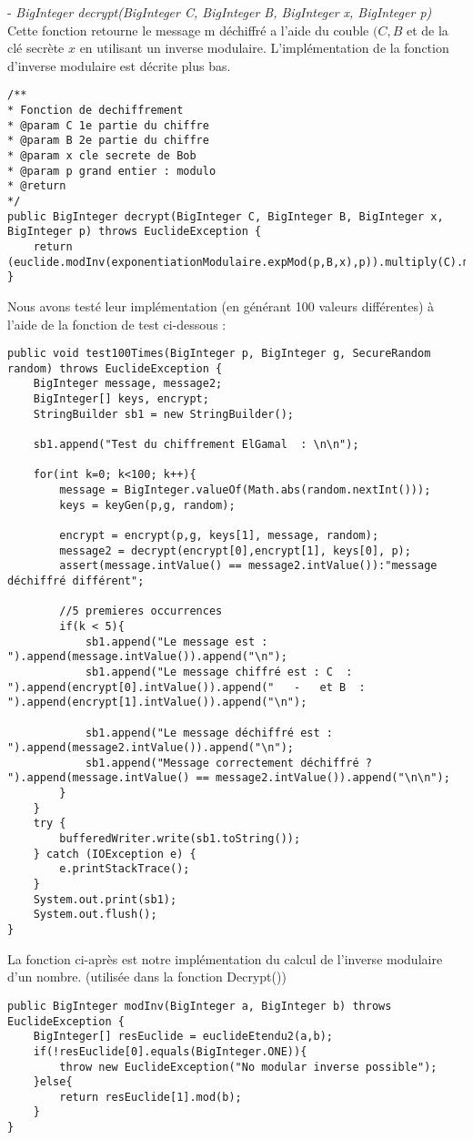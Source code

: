 \documentclass[a4paper,11pt]{article}
\begin{document}
    - \textit{BigInteger decrypt(BigInteger C, BigInteger B, BigInteger x, BigInteger p)} Cette fonction retourne le message m déchiffré a l'aide du couble $(C,B$ et de la clé secrète $x$ en utilisant un inverse modulaire. L'implémentation de la fonction d'inverse modulaire est décrite plus bas.
    \begin{lstlisting}[caption=decrypt, captionpos=b,breaklines = true]
/**
* Fonction de dechiffrement
* @param C 1e partie du chiffre
* @param B 2e partie du chiffre
* @param x cle secrete de Bob
* @param p grand entier : modulo
* @return
*/
public BigInteger decrypt(BigInteger C, BigInteger B, BigInteger x, BigInteger p) throws EuclideException {
    return (euclide.modInv(exponentiationModulaire.expMod(p,B,x),p)).multiply(C).mod(p);
}
    \end{lstlisting}Nous avons testé leur implémentation (en générant 100 valeurs différentes) à l'aide de la fonction de test ci-dessous : \\\begin{lstlisting}[caption=Test chiffrement El-Gamal, captionpos=b,breaklines = true]
public void test100Times(BigInteger p, BigInteger g, SecureRandom random) throws EuclideException {
    BigInteger message, message2;
    BigInteger[] keys, encrypt;
    StringBuilder sb1 = new StringBuilder();

    sb1.append("Test du chiffrement ElGamal  : \n\n");

    for(int k=0; k<100; k++){
        message = BigInteger.valueOf(Math.abs(random.nextInt()));
        keys = keyGen(p,g, random);

        encrypt = encrypt(p,g, keys[1], message, random);
        message2 = decrypt(encrypt[0],encrypt[1], keys[0], p);
        assert(message.intValue() == message2.intValue()):"message déchiffré différent";

        //5 premieres occurrences
        if(k < 5){
            sb1.append("Le message est : ").append(message.intValue()).append("\n");
            sb1.append("Le message chiffré est : C  : ").append(encrypt[0].intValue()).append("   -   et B  : ").append(encrypt[1].intValue()).append("\n");

            sb1.append("Le message déchiffré est : ").append(message2.intValue()).append("\n");
            sb1.append("Message correctement déchiffré ?  ").append(message.intValue() == message2.intValue()).append("\n\n");
        }
    }
    try {
        bufferedWriter.write(sb1.toString());
    } catch (IOException e) {
        e.printStackTrace();
    }
    System.out.print(sb1);
    System.out.flush();
}
    \end{lstlisting}La fonction ci-après est notre implémentation du calcul de l'inverse modulaire d'un nombre. (utilisée dans la fonction Decrypt()) \\\begin{lstlisting}[caption=Inverse modulaire, captionpos=b,breaklines = true]
public BigInteger modInv(BigInteger a, BigInteger b) throws EuclideException {
    BigInteger[] resEuclide = euclideEtendu2(a,b);
    if(!resEuclide[0].equals(BigInteger.ONE)){
        throw new EuclideException("No modular inverse possible");
    }else{
        return resEuclide[1].mod(b);
    }
}
    \end{lstlisting}
\end{document}
